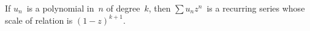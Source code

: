 If $u_{n}$~is a polynomial in~$n$ of degree~$k$, then $\sum u_{n} z^{n}$~is a recurring
series whose scale of relation is $(1 - z)^{k+1}$. 

